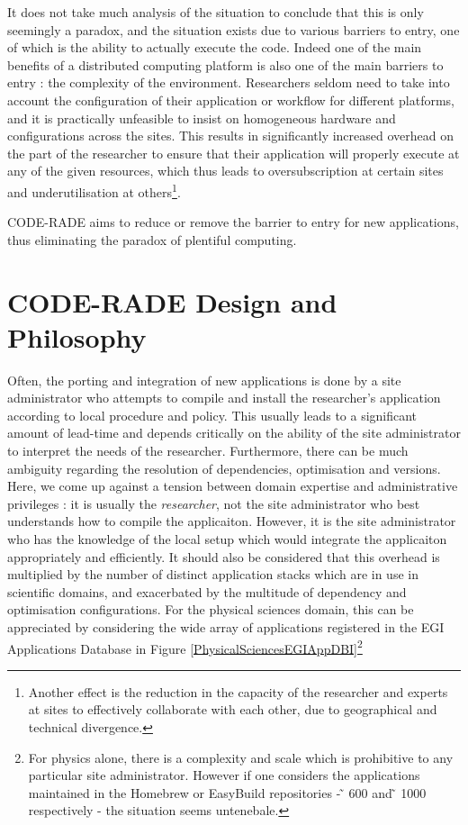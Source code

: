 \documentclass[a4paper]{jpconf}
\begin{document}
It does not take much analysis of the situation to conclude that this is only seemingly a paradox, and the situation exists due to various barriers to entry, one of which is the ability to actually execute the code. Indeed one of the main benefits of a distributed computing platform is also one of the main barriers to entry : the complexity of the environment. Researchers seldom need to take into account the configuration of their application or workflow for different platforms, and it is practically unfeasible to insist on homogeneous hardware and configurations across the sites. This results in significantly increased overhead on the part of the researcher to ensure that their application will properly execute at any of the given resources, which thus leads to oversubscription at certain sites and underutilisation at others\footnote{Another effect is the reduction in the capacity of the researcher and experts at sites to effectively collaborate with each other, due to geographical and technical divergence.}.

CODE-RADE aims to reduce or remove the barrier to entry for new applications, thus eliminating the paradox of plentiful computing.

\section{CODE-RADE Design and Philosophy}

Often, the porting and integration of new applications is done by a site administrator who attempts to compile and install the researcher's application according to local procedure and policy. This usually leads to a significant amount of lead-time and depends critically on the ability of the site administrator to interpret the needs of the researcher. Furthermore, there can be much ambiguity regarding the resolution of dependencies, optimisation and versions. Here, we come up against a tension between domain expertise and administrative privileges : it is usually the {\it researcher}, not the site administrator who best understands how to compile the applicaiton. However, it is the site administrator who has the knowledge of the local setup which would integrate the applicaiton appropriately and efficiently. It should also be considered that this overhead is multiplied by the number of distinct application stacks which are in use in scientific domains, and exacerbated by the multitude of dependency and optimisation configurations. For the physical sciences domain, this can be appreciated by considering the wide array of applications registered in the EGI Applications Database\cite{EGIAppDB} in Figure \ref{PhysicalSciencesEGIAppDBI}\footnote{For physics alone, there is a complexity and scale which is prohibitive to any particular site administrator. However if one considers the applications maintained in the Homebrew or EasyBuild repositories - ̃ 600 and  ̃ 1000 respectively - the situation seems untenebale. }
\end{document}
